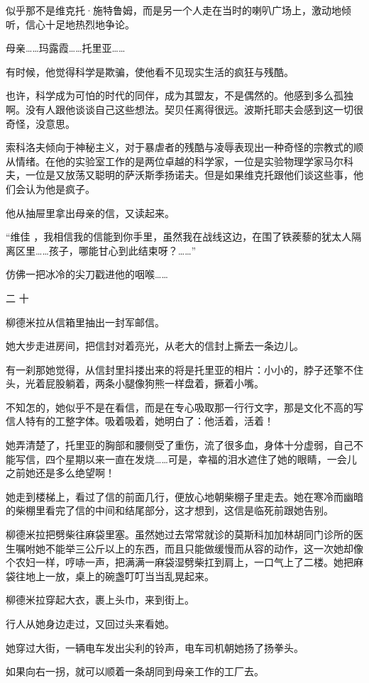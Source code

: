 似乎那不是维克托·施特鲁姆，而是另一个人走在当时的喇叭广场上，激动地倾听，信心十足地热烈地争论。

母亲……玛露霞……托里亚……

有时候，他觉得科学是欺骗，使他看不见现实生活的疯狂与残酷。

也许，科学成为可怕的时代的同伴，成为其盟友，不是偶然的。他感到多么孤独啊。没有人跟他谈谈自己这些想法。契贝任离得很远。波斯托耶夫会感到这一切很奇怪，没意思。

索科洛夫倾向于神秘主义，对于暴虐者的残酷与凌辱表现出一种奇怪的宗教式的顺从情绪。在他的实验室工作的是两位卓越的科学家，一位是实验物理学家马尔科夫，一位是又放荡又聪明的萨沃斯季扬诺夫。但是如果维克托跟他们谈这些事，他们会认为他是疯子。

他从抽屉里拿出母亲的信，又读起来。

“维佳 ，我相信我的信能到你手里，虽然我在战线这边，在围了铁蒺藜的犹太人隔离区里……孩子，哪能甘心到此结束呀？……”

仿佛一把冰冷的尖刀戳进他的咽喉……

二 十

柳德米拉从信箱里抽出一封军邮信。

她大步走进房间，把信封对着亮光，从老大的信封上撕去一条边儿。

有一刹那她觉得，从信封里抖搂出来的将是托里亚的相片：小小的，脖子还擎不住头，光着屁股躺着，两条小腿像狗熊一样盘着，撅着小嘴。

不知怎的，她似乎不是在看信，而是在专心吸取那一行行文字，那是文化不高的写信人特有的工整字体。吸着吸着，她明白了：他活着，活着！

她弄清楚了，托里亚的胸部和腰侧受了重伤，流了很多血，身体十分虚弱，自己不能写信，四个星期以来一直在发烧……可是，幸福的泪水遮住了她的眼睛，一会儿之前她还是多么绝望啊！

她走到楼梯上，看过了信的前面几行，便放心地朝柴棚子里走去。她在寒冷而幽暗的柴棚里看完了信的中间和结尾部分，这才想到，这信是临死前跟她告别。

柳德米拉把劈柴往麻袋里塞。虽然她过去常常就诊的莫斯科加加林胡同门诊所的医生嘱咐她不能举三公斤以上的东西，而且只能做缓慢而从容的动作，这一次她却像个农妇一样，哼哧一声，把满满一麻袋湿劈柴扛到肩上，一口气上了二楼。她把麻袋往地上一放，桌上的碗盏叮叮当当乱晃起来。

柳德米拉穿起大衣，裹上头巾，来到街上。

行人从她身边走过，又回过头来看她。

她穿过大街，一辆电车发出尖利的铃声，电车司机朝她扬了扬拳头。

如果向右一拐，就可以顺着一条胡同到母亲工作的工厂去。

